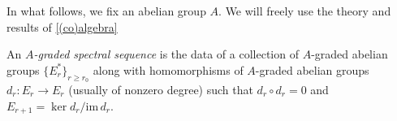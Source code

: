 \documentclass[../main.tex]{subfiles}
\begin{document}
In what follows, we fix an abelian group $A$. We will freely use the theory and results of \autoref{(co)algebra}

\begin{definition}
    An \emph{$A$-graded spectral sequence} is the data of a collection of $A$-graded abelian groups $\{E_r^*\}_{r\ge r_0}$ along with homomorphisms of $A$-graded abelian groups $d_r:E_r\to E_r$ (usually of nonzero degree) such that $d_r\circ d_r=0$ and $E_{r+1}=\ker d_r/\mathrm{im}\,d_r$.
\end{definition}
\end{document}
